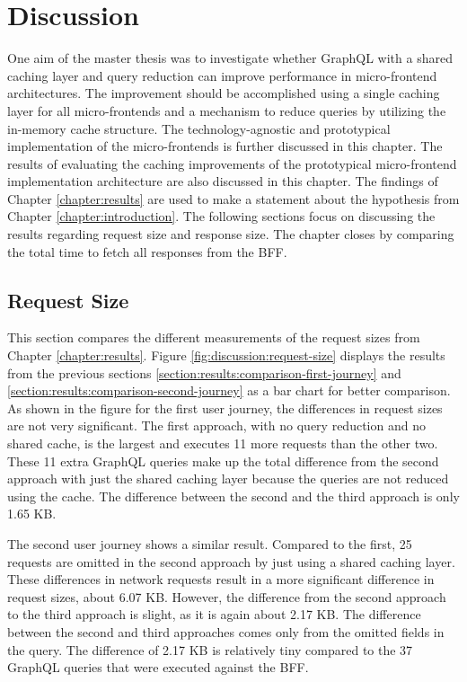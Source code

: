 \chapter{Discussion}\label{chapter:discussion}

One aim of the master thesis was to investigate whether GraphQL with a shared caching layer and query reduction can improve performance in micro-frontend architectures. The improvement should be accomplished using a single caching layer for all micro-frontends and a mechanism to reduce queries by utilizing the in-memory cache structure. The technology-agnostic and prototypical implementation of the micro-frontends is further discussed in this chapter. The results of evaluating the caching improvements of the prototypical micro-frontend implementation architecture are also discussed in this chapter. The findings of Chapter \ref{chapter:results} are used to make a statement about the hypothesis from Chapter \ref{chapter:introduction}. The following sections focus on discussing the results regarding request size and response size. The chapter closes by comparing the total time to fetch all responses from the \ac{BFF}.

\section{Request Size}\label{section:discussion:request-size}

This section compares the different measurements of the request sizes from Chapter \ref{chapter:results}. Figure \ref{fig:discussion:request-size} displays the results from the previous sections \ref{section:results:comparison-first-journey} and \ref{section:results:comparison-second-journey} as a bar chart for better comparison. As shown in the figure for the first user journey, the differences in request sizes are not very significant. The first approach, with no query reduction and no shared cache, is the largest and executes 11 more requests than the other two. These 11 extra GraphQL queries make up the total difference from the second approach with just the shared caching layer because the queries are not reduced using the cache. The difference between the second and the third approach is only 1.65 KB. 

\bigskip

\noindent The second user journey shows a similar result. Compared to the first, 25 requests are omitted in the second approach by just using a shared caching layer. These differences in network requests result in a more significant difference in request sizes, about 6.07 KB. However, the difference from the second approach to the third approach is slight, as it is again about 2.17 KB. The difference between the second and third approaches comes only from the omitted fields in the query. The difference of 2.17 KB is relatively tiny compared to the 37 GraphQL queries that were executed against the \ac{BFF}.

